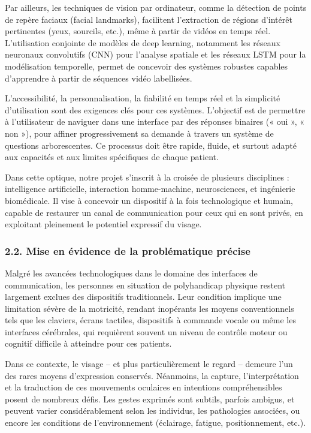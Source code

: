 \documentclass[
]{article}
\begin{document}
Par ailleurs, les techniques de vision par ordinateur, comme la détection de points de repère faciaux (facial landmarks), facilitent l'extraction de régions d'intérêt pertinentes (yeux, sourcils, etc.), même à partir de vidéos en temps réel. L'utilisation conjointe de modèles de deep learning, notamment les réseaux neuronaux convolutifs (CNN) pour l'analyse spatiale et les réseaux LSTM pour la modélisation temporelle, permet de concevoir des systèmes robustes capables d'apprendre à partir de séquences vidéo labellisées.

L'accessibilité, la personnalisation, la fiabilité en temps réel et la simplicité d'utilisation sont des exigences clés pour ces systèmes. L'objectif est de permettre à l'utilisateur de naviguer dans une interface par des réponses binaires (« oui », « non »), pour affiner progressivement sa demande à travers un système de questions arborescentes. Ce processus doit être rapide, fluide, et surtout adapté aux capacités et aux limites spécifiques de chaque patient.

Dans cette optique, notre projet s'inscrit à la croisée de plusieurs disciplines : intelligence artificielle, interaction homme-machine, neurosciences, et ingénierie biomédicale. Il vise à concevoir un dispositif à la fois technologique et humain, capable de restaurer un canal de communication pour ceux qui en sont privés, en exploitant pleinement le potentiel expressif du visage.

\hypertarget{mise-en-uxe9vidence-de-la-probluxe9matique-pruxe9cise}{%
\subsubsection{2.2. Mise en évidence de la problématique précise}\label{mise-en-uxe9vidence-de-la-probluxe9matique-pruxe9cise}}

Malgré les avancées technologiques dans le domaine des interfaces de communication, les personnes en situation de polyhandicap physique restent largement exclues des dispositifs traditionnels. Leur condition implique une limitation sévère de la motricité, rendant inopérants les moyens conventionnels tels que les claviers, écrans tactiles, dispositifs à commande vocale ou même les interfaces cérébrales, qui requièrent souvent un niveau de contrôle moteur ou cognitif difficile à atteindre pour ces patients.

Dans ce contexte, le visage -- et plus particulièrement le regard -- demeure l'un des rares moyens d'expression conservés. Néanmoins, la capture, l'interprétation et la traduction de ces mouvements oculaires en intentions compréhensibles posent de nombreux défis. Les gestes exprimés sont subtils, parfois ambigus, et peuvent varier considérablement selon les individus, les pathologies associées, ou encore les conditions de l'environnement (éclairage, fatigue, positionnement, etc.).
\end{document}

